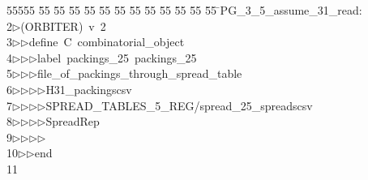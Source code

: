 %
%
\begin{tabbing}
55555 \= 55 \= 55 \= 55 \= 55 \= 55 \= 55 \= 55 \= 55 \= 55 \= 55 \= 55 \= 55 \= \>PG\_3\_5\_assume\_31\_read:\\[0pt]
2\>$\triangleright$\>(ORBITER)\ v\ 2\ \\[0pt]
3\>$\triangleright$\>$\triangleright$\>define\ C\ combinatorial\_object\ \\[0pt]
4\>$\triangleright$\>$\triangleright$\>$\triangleright$\>label\ packings\_25\ packings\_25\ \\[0pt]
5\>$\triangleright$\>$\triangleright$\>$\triangleright$\>file\_of\_packings\_through\_spread\_table\ \\[0pt]
6\>$\triangleright$\>$\triangleright$\>$\triangleright$\>$\triangleright$\>H31\_packingscsv\ \\[0pt]
7\>$\triangleright$\>$\triangleright$\>$\triangleright$\>$\triangleright$\>SPREAD\_TABLES\_5\_REG/spread\_25\_spreadscsv\ \\[0pt]
8\>$\triangleright$\>$\triangleright$\>$\triangleright$\>$\triangleright$\>SpreadRep\ \\[0pt]
9\>$\triangleright$\>$\triangleright$\>$\triangleright$\>$\triangleright$\ \\[0pt]
10\>$\triangleright$\>$\triangleright$\>end\\[0pt]
11\>\end{tabbing}
